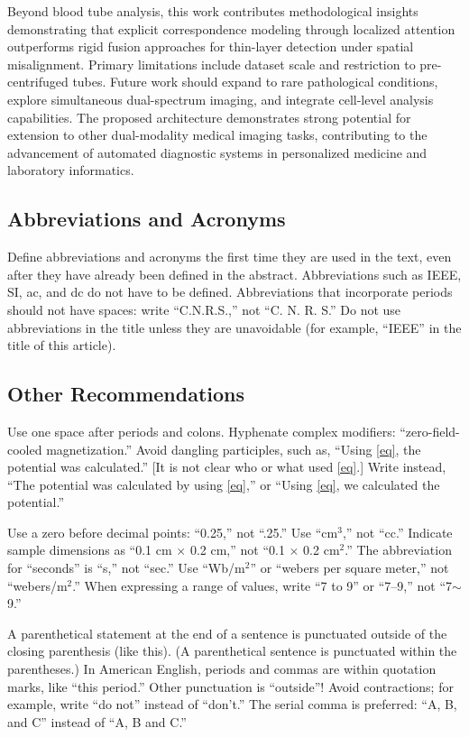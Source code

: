 \documentclass[journal,twoside,web]{ieeecolor}
\begin{document}
Beyond blood tube analysis, this work contributes methodological insights demonstrating that explicit correspondence modeling through localized attention outperforms rigid fusion approaches for thin-layer detection under spatial misalignment. Primary limitations include dataset scale and restriction to pre-centrifuged tubes. Future work should expand to rare pathological conditions, explore simultaneous dual-spectrum imaging, and integrate cell-level analysis capabilities. The proposed architecture demonstrates strong potential for extension to other dual-modality medical imaging tasks, contributing to the advancement of automated diagnostic systems in personalized medicine and laboratory informatics.




\subsection{Abbreviations and Acronyms}
Define abbreviations and acronyms the first time they are used in the text, 
even after they have already been defined in the abstract. Abbreviations 
such as IEEE, SI, ac, and dc do not have to be defined. Abbreviations that 
incorporate periods should not have spaces: write ``C.N.R.S.,'' not ``C. N. 
R. S.'' Do not use abbreviations in the title unless they are unavoidable 
(for example, ``IEEE'' in the title of this article).

\subsection{Other Recommendations}
Use one space after periods and colons. Hyphenate complex modifiers: 
``zero-field-cooled magnetization.'' Avoid dangling participles, such as, 
``Using \eqref{eq}, the potential was calculated.'' [It is not clear who or what 
used \eqref{eq}.] Write instead, ``The potential was calculated by using \eqref{eq},'' or 
``Using \eqref{eq}, we calculated the potential.''

Use a zero before decimal points: ``0.25,'' not ``.25.'' Use 
``cm$^{3}$,'' not ``cc.'' Indicate sample dimensions as ``0.1 cm 
$\times $ 0.2 cm,'' not ``0.1 $\times $ 0.2 cm$^{2}$.'' The 
abbreviation for ``seconds'' is ``s,'' not ``sec.'' Use 
``Wb/m$^{2}$'' or ``webers per square meter,'' not 
``webers/m$^{2}$.'' When expressing a range of values, write ``7 to 
9'' or ``7--9,'' not ``7$\sim $9.''

A parenthetical statement at the end of a sentence is punctuated outside of 
the closing parenthesis (like this). (A parenthetical sentence is punctuated 
within the parentheses.) In American English, periods and commas are within 
quotation marks, like ``this period.'' Other punctuation is ``outside''! 
Avoid contractions; for example, write ``do not'' instead of ``don't.'' The 
serial comma is preferred: ``A, B, and C'' instead of ``A, B and C.''
\end{document}
